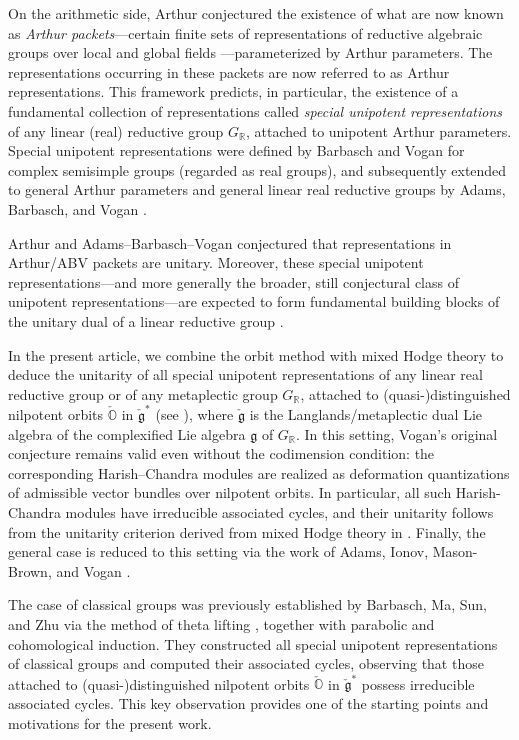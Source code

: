 \documentclass[11pt, a4paper]{amsart}
\newcommand{\orb}{\mathbb{O}}
\newcommand{\fg}{\mathfrak{g}}
\newcommand{\ckfg}{{\check{\fg}}}
\newcommand{\ckorb}{\check{\orb}}
\newcommand{\R}{\mathbb{R}}
\newcommand{\GR}{G_\R}
\theoremstyle{definition}
\numberwithin{equation}{section}
\begin{document}
On the arithmetic side, Arthur conjectured the existence of what are now known as \emph{Arthur packets}—certain finite sets of representations of reductive algebraic groups over local and global fields \cite{Arthur84, Arthur89}—parameterized by Arthur parameters.
The representations occurring in these packets are now referred to as Arthur representations.
This framework predicts, in particular, the existence of a fundamental collection of representations called \emph{special unipotent representations} of any linear (real) reductive group $\GR$, attached to unipotent Arthur parameters.
Special unipotent representations were defined by Barbasch and Vogan \cite{BV85:unipotent} for complex semisimple groups (regarded as real groups), and subsequently extended to general Arthur parameters and general linear real reductive groups by Adams, Barbasch, and Vogan \cite{ABV}.

Arthur \cite[Section 4]{Arthur89} and Adams--Barbasch--Vogan \cite[Chapter 1, Problem F]{ABV} conjectured that representations in Arthur/ABV packets are unitary. 
Moreover, these special unipotent representations—and more generally the broader, still conjectural class of unipotent representations—are expected to form fundamental building blocks of the unitary dual of a linear reductive group \cite{Vogan:unitary}.

In the present article, we combine the orbit method with mixed Hodge theory to deduce the unitarity of all special unipotent representations of any linear real reductive group or of any metaplectic group $\GR$, attached to (quasi-)distinguished nilpotent orbits $\ckorb$ in $\ckfg^*$ (see ), where $\ckfg$ is the Langlands/metaplectic dual Lie algebra of the complexified Lie algebra $\fg$ of $\GR$. In this setting, Vogan's original conjecture remains valid even without the codimension condition: the corresponding Harish--Chandra modules are realized as deformation quantizations of admissible vector bundles over nilpotent orbits.
In particular, all such Harish-Chandra modules have irreducible associated cycles, and their unitarity follows from the unitarity criterion derived from mixed Hodge theory in \cite{DMB-Hodge}. Finally, the general case is reduced to this setting via the work of Adams, Ionov, Mason-Brown, and Vogan \cite{AIMV:ArthurPackets}.

The case of classical groups was previously established by Barbasch, Ma, Sun, and Zhu \cite{BMSZ:counting, BMSZ:construction_unitarity} via the method of theta lifting \cite{Howe79, Howe89}, together with parabolic and cohomological induction. They constructed all special unipotent representations of classical groups and computed their associated cycles, observing that those attached to (quasi-)distinguished nilpotent orbits $\ckorb$ in $\ckfg^*$ possess irreducible associated cycles. This key observation provides one of the starting points and motivations for the present work.
\end{document}
